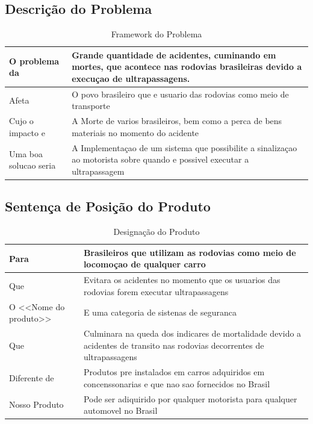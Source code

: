 \subsection{Descrição do Problema}
\begin{table}[ht]
\caption{Framework do Problema}
\centering
\begin{tabular}{| l |  p{7cm} |}
\hline
O problema da & Grande quantidade de acidentes, cuminando em mortes, que acontece nas rodovias brasileiras devido a execuçao de ultrapassagens.  \\
\hline
Afeta & O povo brasileiro que e usuario das rodovias como meio de transporte \\
\hline
Cujo o impacto e & A Morte de varios brasileiros, bem como a perca de bens materiais no momento do acidente\\
\hline
Uma boa solucao seria & A Implementaçao de um sistema que possibilite a sinalizaçao ao motorista sobre quando e possivel executar a ultrapassagem \\
\hline
\end{tabular}
\end{table}


\subsection{Sentença de Posição do Produto}

\begin{table}[ht]
\caption{Designação do Produto}
\centering
\begin{tabular}{| l |  p{7cm} |}
\hline
Para & Brasileiros que utilizam as rodovias como meio de locomoçao de qualquer carro \\
\hline
Que & Evitara os acidentes no momento que os usuarios das rodovias forem executar ultrapassagens \\
\hline
O <<Nome do produto>> & E uma categoria de sistenas de seguranca\\
\hline
Que & Culminara na queda dos indicares de mortalidade devido a acidentes de transito nas rodovias decorrentes de ultrapassagens \\
\hline
Diferente de & Produtos pre instalados em carros adquiridos em concenssonarias e que nao sao fornecidos no Brasil  \\
\hline
Nosso Produto & Pode ser adiquirido por qualquer motorista para qualquer automovel no Brasil\\
\hline
\end{tabular}
\end{table}


